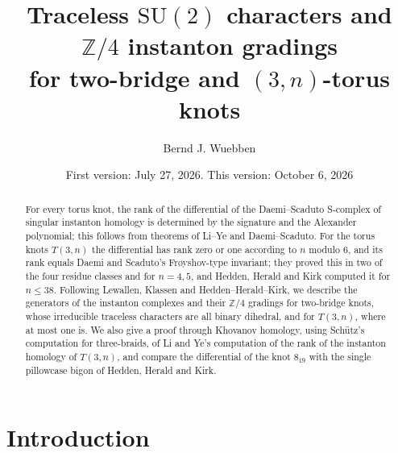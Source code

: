 \documentclass[11pt,reqno]{amsart}
\theoremstyle{plain}
\theoremstyle{definition}
\newcommand{\Z}{\mathbb{Z}}
\newcommand{\SU}{\mathrm{SU}(2)}
\begin{document}
\title[Traceless characters and instanton gradings for $2$-bridge and $(3,n)$ knots]
{Traceless $\SU$ characters and $\Z/4$ instanton gradings\\ for two-bridge and $(3,n)$-torus knots}

\author{Bernd J. Wuebben}
\date{First version: July 27, 2026. This version: October 6, 2026}

\begin{abstract}
For every torus knot, the rank of the differential of the Daemi--Scaduto S-complex of singular instanton
homology is determined by the signature and the Alexander polynomial; this follows from theorems of Li--Ye
and Daemi--Scaduto. For the torus knots $T(3,n)$ the differential has rank zero or one according to $n$
modulo $6$, and its rank equals Daemi and Scaduto's Frøyshov-type invariant; they proved this in two of the
four residue classes and for $n=4,5$, and Hedden, Herald and Kirk computed it for $n\le38$. Following
Lewallen, Klassen and Hedden--Herald--Kirk, we describe the generators of the instanton complexes and their
$\Z/4$ gradings for two-bridge knots, whose irreducible traceless characters are all binary dihedral, and
for $T(3,n)$, where at most one is. We also give a proof through Khovanov homology, using Sch\"utz's
computation for three-braids, of Li and Ye's computation of the rank of the instanton homology of $T(3,n)$,
and compare the differential of the knot $8_{19}$ with the single pillowcase bigon of Hedden, Herald and
Kirk.
\end{abstract}

\maketitle

\section{Introduction}
\end{document}
